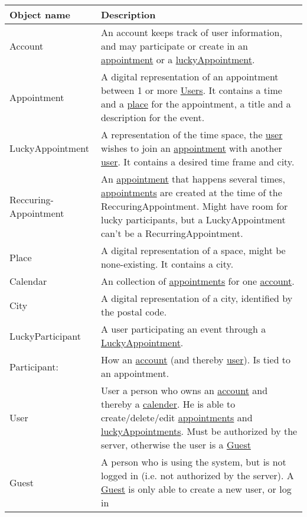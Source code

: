 {\tabulinesep=1.2mm
\begin{tabu}{ | p{3cm} | p{13cm} |}\hline
    Object name 			& 		Description\\\hline
    Account 				& 		An account keeps track of user information, and may participate or create in an \uline{appointment} or a \uline{luckyAppointment}. \\\hline
	Appointment				&		A digital representation of an appointment between 1 or more \uline{Users}. It contains a time and a \uline{place} for the appointment, a title and a description for the event.\\\hline
	LuckyAppointment		&		A representation of the time space, the \uline{user} wishes to join an \uline{appointment} with another \uline{user}. It contains a desired time frame and city.\\\hline
	Reccuring-Appointment	&		An \uline{appointment} that happens several times, \uline{appointments} are created at the time of the ReccuringAppointment. Might have room for lucky participants, but a LuckyAppointment can't be a RecurringAppointment. \\ \hline
    Place 					& 		A digital representation of a space, might be none-existing. It contains a city.\\\hline
	Calendar				&		An collection of \uline{appointments} for one \uline{account}.\\ \hline
    City 					& 		A digital representation of a city, identified by the postal code.\\\hline
	LuckyParticipant		&		A user participating an event through a \uline{LuckyAppointment}.\\\hline
	Participant: 			&		How an \uline{account} (and thereby \uline{user}). Is tied to an appointment.\\\hline
    User  					& 		User a person who owns an \uline{account} and thereby a \uline{calender}. He is able to create/delete/edit \uline{appointments} and  \uline{luckyAppointments}. Must be authorized by the server, otherwise the user is a \uline{Guest} \\\hline
    Guest					&		A person who is using the system, but is not logged in (i.e. not authorized by the server). A \uline{Guest} is only able to create a new user, or log in \\\hline
\end{tabu}
}